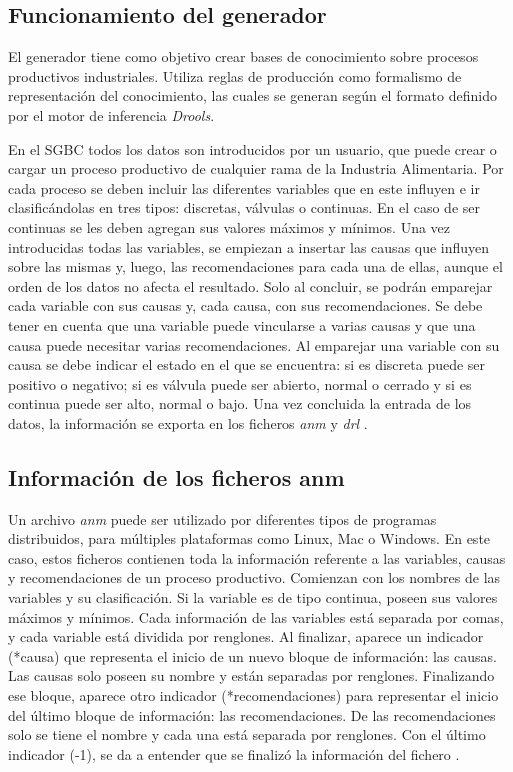 \subsection{Funcionamiento del generador}
El generador tiene como objetivo crear bases de conocimiento sobre procesos productivos industriales. Utiliza reglas de producción como formalismo de representación del conocimiento, las cuales se generan según el formato definido por el motor de inferencia \textsl{Drools}.

En el SGBC todos los datos son introducidos por un usuario, que puede crear o cargar un proceso productivo de cualquier rama de la Industria Alimentaria. Por cada proceso se deben incluir las diferentes variables que en este influyen e ir clasificándolas en tres tipos: discretas, válvulas o continuas. En el caso de ser continuas se les deben agregan sus valores máximos y mínimos. Una vez introducidas todas las variables, se empiezan a insertar las causas que influyen sobre las mismas y, luego, las recomendaciones para cada una de ellas, aunque el orden de los datos no afecta el resultado. Solo al concluir, se podrán emparejar cada variable con sus causas y, cada causa, con sus recomendaciones. Se debe tener en cuenta que una variable puede vincularse a varias causas y que una causa puede necesitar varias recomendaciones. Al emparejar una variable con su causa se debe indicar el estado en el que se encuentra: si es discreta puede ser positivo o negativo; si es válvula puede ser abierto, normal o cerrado y si es continua puede ser alto, normal o bajo. Una vez concluida la entrada de los datos, la información se exporta en los ficheros \textsl{anm} y \textsl{drl} \cite{Riveron2017}.

\subsection{Información de los ficheros anm}
Un archivo \textsl{anm} puede ser utilizado por diferentes tipos de programas distribuidos, para múltiples plataformas como Linux, Mac o Windows. En este caso, estos ficheros contienen toda la información referente a las variables, causas y recomendaciones de un proceso productivo.
Comienzan con los nombres de las variables y su clasificación. Si la variable es de tipo continua, poseen sus valores máximos y mínimos. Cada información de las variables está separada por comas, y cada variable está dividida por renglones.
Al finalizar, aparece un indicador (*causa) que representa el inicio de un nuevo bloque de información: las causas. Las causas solo poseen su nombre y están separadas por renglones. Finalizando ese bloque, aparece otro indicador (*recomendaciones) para representar el inicio del último bloque de información: las recomendaciones.
De las recomendaciones solo se tiene el nombre y cada una está separada por renglones. Con el último indicador (-1), se da a entender que se finalizó la información del fichero \cite{Riveron2017}.

